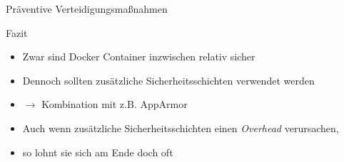 \begin{frame}{Präventive Verteidigungsmaßnahmen}
  \begin{block}{Fazit}
    \begin{itemize}[<+->]
      \item Zwar sind Docker Container inzwischen relativ sicher
      \item Dennoch sollten zusätzliche Sicherheitsschichten verwendet werden
      \item $\rightarrow$ Kombination mit z.B. AppArmor
      \item Auch wenn zusätzliche Sicherheitsschichten einen \textit{Overhead} verursachen,
      \item so lohnt sie sich am Ende doch oft
    \end{itemize}
  \end{block}
\end{frame}
